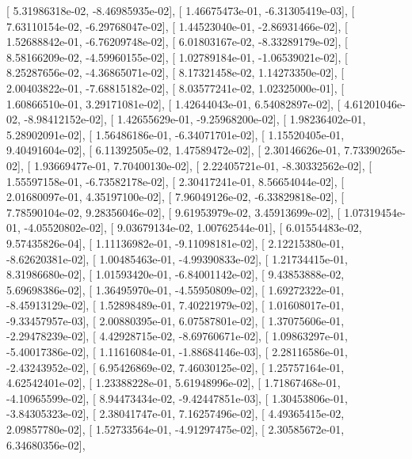 \documentclass{article}
\begin{document}
       [  5.31986318e-02,  -8.46985935e-02],
       [  1.46675473e-01,  -6.31305419e-03],
       [  7.63110154e-02,  -6.29768047e-02],
       [  1.44523040e-01,  -2.86931466e-02],
       [  1.52688842e-01,  -6.76209748e-02],
       [  6.01803167e-02,  -8.33289179e-02],
       [  8.58166209e-02,  -4.59960155e-02],
       [  1.02789184e-01,  -1.06539021e-02],
       [  8.25287656e-02,  -4.36865071e-02],
       [  8.17321458e-02,   1.14273350e-02],
       [  2.00403822e-01,  -7.68815182e-02],
       [  8.03577241e-02,   1.02325000e-01],
       [  1.60866510e-01,   3.29171081e-02],
       [  1.42644043e-01,   6.54082897e-02],
       [  4.61201046e-02,  -8.98412152e-02],
       [  1.42655629e-01,  -9.25968200e-02],
       [  1.98236402e-01,   5.28902091e-02],
       [  1.56486186e-01,  -6.34071701e-02],
       [  1.15520405e-01,   9.40491604e-02],
       [  6.11392505e-02,   1.47589472e-02],
       [  2.30146626e-01,   7.73390265e-02],
       [  1.93669477e-01,   7.70400130e-02],
       [  2.22405721e-01,  -8.30332562e-02],
       [  1.55597158e-01,  -6.73582178e-02],
       [  2.30417241e-01,   8.56654044e-02],
       [  2.01680097e-01,   4.35197100e-02],
       [  7.96049126e-02,  -6.33829818e-02],
       [  7.78590104e-02,   9.28356046e-02],
       [  9.61953979e-02,   3.45913699e-02],
       [  1.07319454e-01,  -4.05520802e-02],
       [  9.03679134e-02,   1.00762544e-01],
       [  6.01554483e-02,   9.57435826e-04],
       [  1.11136982e-01,  -9.11098181e-02],
       [  2.12215380e-01,  -8.62620381e-02],
       [  1.00485463e-01,  -4.99390833e-02],
       [  1.21734415e-01,   8.31986680e-02],
       [  1.01593420e-01,  -6.84001142e-02],
       [  9.43853888e-02,   5.69698386e-02],
       [  1.36495970e-01,  -4.55950809e-02],
       [  1.69272322e-01,  -8.45913129e-02],
       [  1.52898489e-01,   7.40221979e-02],
       [  1.01608017e-01,  -9.33457957e-03],
       [  2.00880395e-01,   6.07587801e-02],
       [  1.37075606e-01,  -2.29478239e-02],
       [  4.42928715e-02,  -8.69760671e-02],
       [  1.09863297e-01,  -5.40017386e-02],
       [  1.11616084e-01,  -1.88684146e-03],
       [  2.28116586e-01,  -2.43243952e-02],
       [  6.95426869e-02,   7.46030125e-02],
       [  1.25757164e-01,   4.62542401e-02],
       [  1.23388228e-01,   5.61948996e-02],
       [  1.71867468e-01,  -4.10965599e-02],
       [  8.94473434e-02,  -9.42447851e-03],
       [  1.30453806e-01,  -3.84305323e-02],
       [  2.38041747e-01,   7.16257496e-02],
       [  4.49365415e-02,   2.09857780e-02],
       [  1.52733564e-01,  -4.91297475e-02],
       [  2.30585672e-01,   6.34680356e-02],
\end{document}
